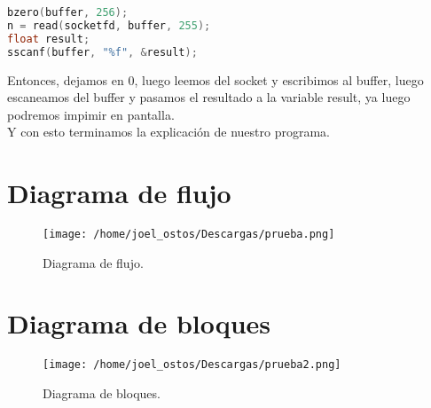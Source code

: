 \documentclass{article}
\begin{document}
\begin{lstlisting}[language=C]
bzero(buffer, 256);
n = read(socketfd, buffer, 255);
float result;
sscanf(buffer, "%f", &result);
\end{lstlisting}

Entonces, dejamos en 0, luego leemos del socket y escribimos al buffer, luego escaneamos del buffer y pasamos el resultado a la variable result, ya luego podremos impimir en pantalla.\\ 
Y con esto terminamos la explicación de nuestro programa.

\section{Diagrama de flujo}
\begin{figure}[H]
\centering
\texttt{[image: /home/joel\_ostos/Descargas/prueba.png]}
\caption{Diagrama de flujo.}
\end{figure}
\section{Diagrama de bloques}
\begin{figure}[h!]
\centering
\texttt{[image: /home/joel\_ostos/Descargas/prueba2.png]}
\caption{Diagrama de bloques.}
\end{figure}
\newpage


\end{document}
